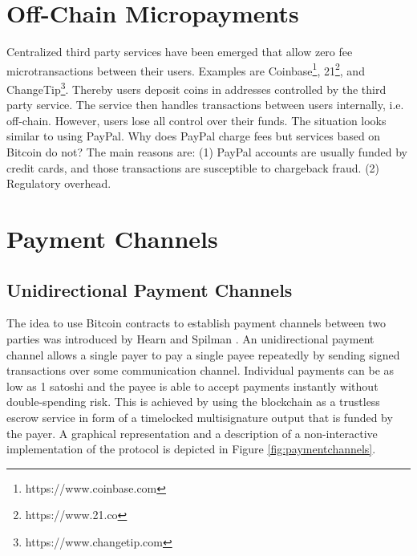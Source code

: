 \section{Off-Chain Micropayments}

Centralized third party services have been emerged that allow zero fee microtransactions between their users. Examples are Coinbase\footnote{https://www.coinbase.com}, 21\footnote{https://www.21.co}, and ChangeTip\footnote{https://www.changetip.com}. Thereby users deposit coins in addresses controlled by the third party service. The service then handles transactions between users internally, i.e. off-chain. However, users lose all control over their funds. The situation looks similar to using PayPal. Why does PayPal charge fees but services based on Bitcoin do not? The main reasons are: (1) PayPal accounts are usually funded by credit cards, and those transactions are susceptible to chargeback fraud. (2) Regulatory overhead. 

\section{Payment Channels}

\subsection{Unidirectional Payment Channels}
\label{sec:unipc}

The idea to use Bitcoin contracts to establish payment channels between two parties was introduced by Hearn and Spilman \cite{Hearn}. An unidirectional payment channel allows a single payer to pay a single payee repeatedly by sending signed transactions over some communication channel. Individual payments can be as low as 1 satoshi and the payee is able to accept payments instantly without double-spending risk. This is achieved by using the blockchain as a trustless escrow service in form of a timelocked multisignature output that is funded by the payer. A graphical representation and a description of a non-interactive implementation of the protocol is depicted in Figure \ref{fig:paymentchannels}.

